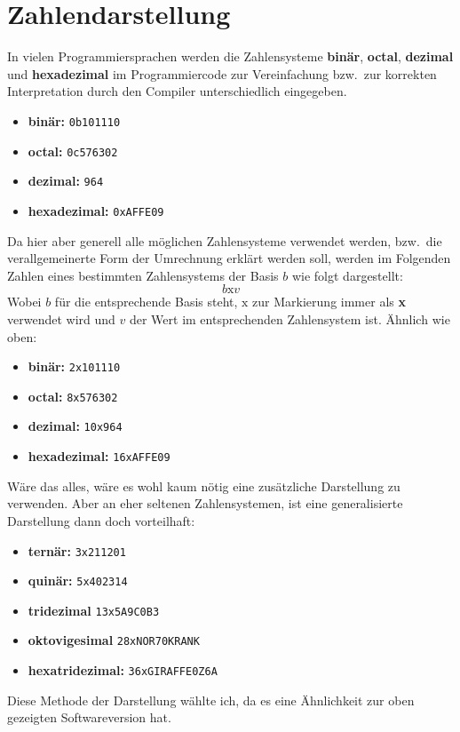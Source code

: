 \documentclass[a4paper,12pt,twoside]{book}
\begin{document}
\section{Zahlendarstellung}
In vielen Programmiersprachen werden die Zahlensysteme \textbf{binär}, \textbf{octal}, \textbf{dezimal} und \textbf{hexadezimal} im Programmiercode zur Vereinfachung bzw.\ zur korrekten Interpretation durch den Compiler unterschiedlich eingegeben.
\begin{itemize}
	\item \textbf{binär:} \texttt{0b101110}
	\item \textbf{octal:} \texttt{0c576302}
	\item \textbf{dezimal:} \texttt{964}
	\item \textbf{hexadezimal:} \texttt{0xAFFE09}
\end{itemize}
Da hier aber generell alle möglichen Zahlensysteme verwendet werden, bzw.\ die verallgemeinerte Form der Umrechnung erklärt werden soll, werden im Folgenden Zahlen eines bestimmten Zahlensystems der Basis $b$ wie folgt dargestellt:
\[b\mathrm{x}v\]
Wobei $b$ für die entsprechende Basis steht, $\mathrm{x}$ zur Markierung immer als \textbf{x} verwendet wird und $v$ der Wert im entsprechenden Zahlensystem ist.
Ähnlich wie oben:
\begin{itemize}
	\item \textbf{binär:} \texttt{2x101110}
	\item \textbf{octal:} \texttt{8x576302}
	\item \textbf{dezimal:} \texttt{10x964}
	\item \textbf{hexadezimal:} \texttt{16xAFFE09}
\end{itemize} 
Wäre das alles, wäre es wohl kaum nötig eine zusätzliche Darstellung zu verwenden.
Aber an eher seltenen Zahlensystemen, ist eine generalisierte Darstellung dann doch vorteilhaft:
\begin{itemize}
	\item \textbf{ternär:} \texttt{3x211201}
	\item \textbf{quinär:} \texttt{5x402314}
	\item \textbf{tridezimal} \texttt{13x5A9C0B3}
	\item \textbf{oktovigesimal} \texttt{28xNOR70KRANK}
	\item \textbf{hexatridezimal:} \texttt{36xGIRAFFE0Z6A}
\end{itemize}
Diese Methode der Darstellung wählte ich, da es eine Ähnlichkeit zur oben gezeigten Softwareversion hat.
\end{document}
